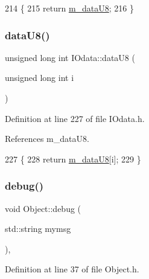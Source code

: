 \begin{DoxyCode}
214               \{
215     \textcolor{keywordflow}{return} \hyperlink{classIOdata_a9c4c0dc5104f7f3b170e30ab78fe61e7}{m\_dataU8};
216   \}
\end{DoxyCode}
\mbox{\label{classIOdata_a9c7cc68c435e1b22dcdac7c17d186e63}} 
\subsubsection{\texorpdfstring{data\+U8()}{dataU8()}\hspace{0.1cm}{\footnotesize\ttfamily [2/2]}}
{\footnotesize\ttfamily unsigned long int I\+Odata\+::data\+U8 (\begin{DoxyParamCaption}\item[{unsigned long int}]{i }\end{DoxyParamCaption})\hspace{0.3cm}{\ttfamily [inline]}}



Definition at line 227 of file I\+Odata.\+h.



References m\+\_\+data\+U8.


\begin{DoxyCode}
227                                                \{
228     \textcolor{keywordflow}{return} \hyperlink{classIOdata_a9c4c0dc5104f7f3b170e30ab78fe61e7}{m\_dataU8}[i];
229   \}
\end{DoxyCode}
\mbox{\label{classObject_aac010553f022165573714b7014a15f0d}} 
\subsubsection{\texorpdfstring{debug()}{debug()}\hspace{0.1cm}{\footnotesize\ttfamily [1/2]}}
{\footnotesize\ttfamily void Object\+::debug (\begin{DoxyParamCaption}\item[{std\+::string}]{mymsg }\end{DoxyParamCaption})\hspace{0.3cm}{\ttfamily [inline]}, {\ttfamily [inherited]}}



Definition at line 37 of file Object.\+h.



